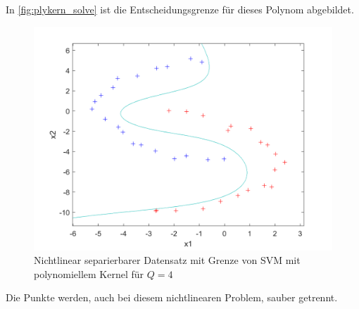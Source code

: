 \documentclass[a4paper,11pt,twoside]{scrreprt}
\begin{document}
In \autoref{fig:plykern_solve} ist die Entscheidungsgrenze für dieses Polynom abgebildet.
\begin{figure}[H]
    \centering
    \includegraphics[width = 16cm]{../code/octave/images/sgddatasetkernelsolve}
    \caption{Nichtlinear separierbarer Datensatz mit Grenze von \ac{SVM} mit polynomiellem Kernel für $Q=4$}
    \label{fig:plykern_solve}
\end{figure}
Die Punkte werden, auch bei diesem nichtlinearen Problem, sauber getrennt.
\end{document}
